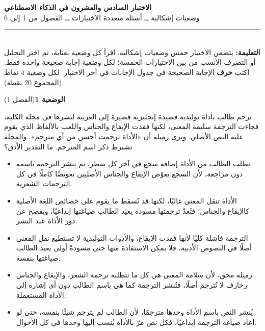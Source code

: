 \documentclass[11pt,a4paper]{article}
\begin{document}
\linespread{1.08}\selectfont
\begin{center}
{\LARGE\khatt\textbf{الاختبار السادس والعشرون في الذكاء الاصطناعي}}\\[4pt]
{\normalsize وضعيات إشكالية ــ أسئلة متعددة الاختيارات ــ الفصول من 1 إلى 6}
\end{center}
\vspace{-2pt}\rule{\textwidth}{0.6pt}\\[2pt]
\textbf{التعليمة:} يتضمن الاختبار خمس وضعيات إشكالية. اقرأ كل وضعية بعناية، ثم اختر التحليل أو التصرف الأنسب
من بين الاختيارات الخمسة؛ لكل وضعية إجابة صحيحة واحدة فقط.
اكتب \textbf{حرف} الإجابة الصحيحة في جدول الإجابات في آخر الاختبار.
لكل وضعية 4 نقاط (المجموع 20 نقطة).
\vspace{4pt}

\noindent
{\large\khatt\textbf{الوضعية 1}}\hfill{\small(الفصل 1)}\par\nopagebreak\vspace{3pt}
\setlength{\fboxsep}{7pt}\colorbox{gray!10}{\parbox{\dimexpr\linewidth-14pt}{ترجم طالب بأداة توليدية قصيدة إنجليزية قصيرة إلى العربية لنشرها في مجلة الكلية، فجاءت الترجمة سليمة المعنى، لكنها فقدت الإيقاع والجناس واللعب بالألفاظ الذي يقوم عليه النص الأصلي. ويرى زميله أن «الأداة ترجمت أحسن من أي مترجم». والمجلة تشترط ذكر اسم المترجم. ما التقدير الأدق؟}}\par\nopagebreak
\begin{itemize}[leftmargin=1.0cm, labelsep=6pt, itemsep=3pt, topsep=4pt, parsep=0pt]
  \item[\textbf{أ)}] يطلب الطالب من الأداة إضافة سجع في آخر كل سطر، ثم ينشر الترجمة باسمه دون مراجعة، لأن السجع يعوّض الإيقاع والجناس الأصليين تعويضًا كاملًا في كل الترجمات الشعرية.
  \item[\textbf{ب)}] الأداة تنقل المعنى غالبًا، لكنها قد تُسقط ما يقوم على خصائص اللغة الأصلية كالإيقاع والجناس؛ فتُعدّ ترجمتها مسودة يعيد الطالب صياغتها إبداعيًا، ويفصح عن دور الأداة عند النشر.
  \item[\textbf{ج)}] الترجمة فاشلة كليًا لأنها فقدت الإيقاع، والأدوات التوليدية لا تستطيع نقل المعنى أصلًا في النصوص الأدبية، فلا يمكن الاستفادة منها حتى مسودةً أولى يعيد الطالب صياغتها بنفسه.
  \item[\textbf{د)}] زميله محق، لأن سلامة المعنى هي كل ما تتطلبه ترجمة الشعر، والإيقاع والجناس زخارف لا تُترجم أصلًا، فتُنشر الترجمة كما هي باسم الطالب دون أي إشارة إلى الأداة المستعملة.
  \item[\textbf{هـ)}] يُنشر النص باسم الأداة وحدها مترجمًا، لأن الطالب لم يترجم شيئًا بنفسه، حتى لو أعاد صياغة الترجمة إبداعيًا، فكل نص مرّ بالأداة يُنسب إليها وحدها في كل الأحوال.
\end{itemize}
\end{document}
